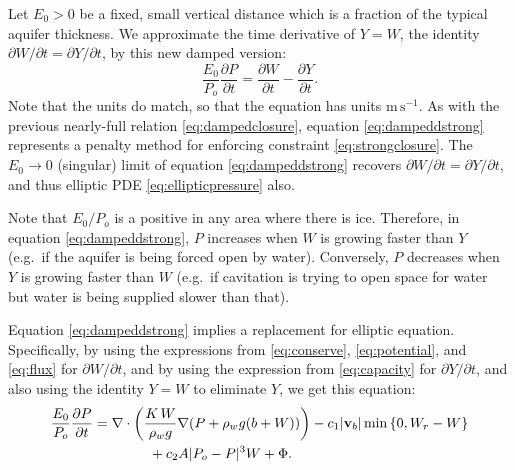 \documentclass[12pt,final]{amsart}%
\newcommand\bv{\mathbf{v}}
\newcommand{\Div}{\nabla\cdot}
\newcommand{\grad}{\nabla}
\begin{document}
Let $E_0>0$ be a fixed, small vertical distance which is a fraction of the typical aquifer thickness.  We approximate the time derivative of $Y=W$, the identity $\partial W/\partial t = \partial Y/\partial t$, by this new damped version:
\begin{equation}
\frac{E_0}{P_o} \frac{\partial P}{\partial t} =  \frac{\partial W}{\partial t}  - \frac{\partial Y}{\partial t}.\label{eq:dampeddstrong}
\end{equation}
Note that the units do match, so that the equation has units $\text{m}\,\text{s}^{-1}$.  As with the previous nearly-full relation \eqref{eq:dampedclosure}, equation \eqref{eq:dampeddstrong} represents a penalty method for enforcing constraint \eqref{eq:strongclosure}.  The $E_0\to 0$ (singular) limit of equation \eqref{eq:dampeddstrong} recovers $\partial W/\partial t = \partial Y/\partial t$, and thus elliptic PDE \eqref{eq:ellipticpressure} also.

Note that $E_0/P_o$ is a positive in any area where there is ice.  Therefore, in equation \eqref{eq:dampeddstrong}, $P$ increases when $W$ is growing faster than $Y$ (e.g.~if the aquifer is being forced open by water).  Conversely, $P$ decreases when $Y$ is growing faster than $W$ (e.g.~if cavitation is trying to open space for water but water is being supplied slower than that).

Equation \eqref{eq:dampeddstrong} implies a replacement for elliptic equation.  Specifically, by using the expressions from \eqref{eq:conserve}, \eqref{eq:potential}, and \eqref{eq:flux} for $\partial W/\partial t$, and by using the expression from \eqref{eq:capacity} for $\partial Y/\partial t$, and also using the identity $Y=W$ to eliminate $Y$, we get this equation:
\begin{align}
\frac{E_0}{P_o} \frac{\partial P}{\partial t} &= \Div \left(\frac{K\,W}{\rho_w g} \grad (P+\rho_w g (b+W))\right) - c_1 |\bv_b| \min\left\{0,W_r - W\right\} \label{eq:diffusionpressure} \\
  &\qquad\qquad + c_2 A |P_o - P|^3 W  + \Phi. \notag
\end{align}
\end{document}
